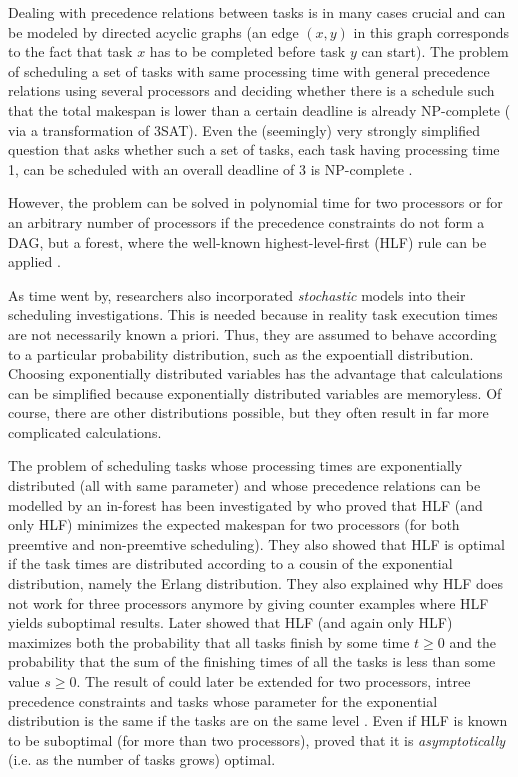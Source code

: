 Dealing with precedence relations between tasks is in many cases crucial and can be modeled by directed acyclic graphs (an edge $(x,y)$ in this graph corresponds to the fact that task $x$ has to be completed before task $y$ can start). The problem of scheduling a set of tasks with same processing time with general precedence relations using several processors and deciding whether there is a schedule such that the total makespan is lower than a certain deadline is already NP-complete (\cite{Ullman:1975:NSP:1739944.1740138} via a transformation of 3SAT). Even the (seemingly) very strongly simplified question that asks whether such a set of tasks, each task having processing time 1, can be scheduled with an overall deadline of 3 is NP-complete \cite{lenstra-kan-1978}.

However, the problem can be solved in polynomial time for two processors \cite{coffman-graham-famous-two-proc-result} or for an arbitrary number of processors if the precedence constraints do not form a DAG, but a forest, where the well-known highest-level-first (HLF) rule can be applied \cite{hu:1961:hlfoptimalforknowntimesintree}. 

As time went by, researchers also incorporated \emph{stochastic} models into their scheduling investigations. This is needed because in reality task execution times are not necessarily known a priori. Thus, they are assumed to behave according to a particular probability distribution, such as the expoentiall distribution. Choosing exponentially distributed variables has the advantage that calculations can be simplified because exponentially distributed variables are memoryless. Of course, there are other distributions possible, but they often result in far more complicated calculations.

The problem of scheduling tasks whose processing times are exponentially distributed (all with same parameter) and whose precedence relations can be modelled by an in-forest has been investigated by \cite{chandyreynoldsshortpaper1975} who proved that HLF (and only HLF) minimizes the expected makespan for two processors (for both preemtive and non-preemtive scheduling). They also showed that HLF is optimal if the task times are distributed according to a cousin of the exponential distribution, namely the Erlang distribution. They also explained why HLF does not work for three processors anymore by giving counter examples where HLF yields suboptimal results. Later \cite{bruno-1985} showed that HLF (and again only HLF) maximizes both the probability that all tasks finish by some time $t\geq 0$ and the probability that the sum of the finishing times of all the tasks is less than some value $s\geq 0$. The result of \cite{chandyreynoldsshortpaper1975} could later be extended for two processors, intree precedence constraints and tasks whose parameter for the exponential distribution is the same if the tasks are on the same level \cite{pinedo-weiss}. Even if HLF is known to be suboptimal (for more than two processors), \cite{journals/siamcomp/PapadimitriouT87} proved that it is \emph{asymptotically} (i.e. as the number of tasks grows) optimal.

